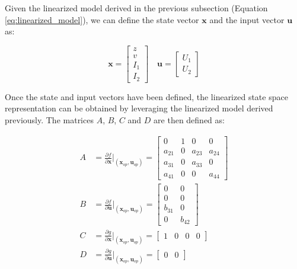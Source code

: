 Given the linearized model derived in the previous subsection (Equation \ref{eq:linearized_model}), we can define the state vector $\mathbf{x}$ and the input vector $\mathbf{u}$ as:

\begin{equation}
    \mathbf{x} = \begin{bmatrix}
        z   \\
        v   \\
        I_1 \\
        I_2
    \end{bmatrix}
    \quad
    \mathbf{u} = \begin{bmatrix}
        U_1 \\
        U_2
    \end{bmatrix}
\end{equation}

Once the state and input vectors have been defined, the linearized state space representation can be obtained by leveraging the linearized model derived previously.
The matrices $A$, $B$, $C$ and $D$ are then defined as:

\begin{equation}
    \begin{aligned}
        A & = \frac{\partial f}{\partial \mathbf{x}} \Bigg|_{(\mathbf{x}_{op}, \mathbf{u}_{op})}
        = \begin{bmatrix}
              0      & 1 & 0      & 0      \\
              a_{21} & 0 & a_{23} & a_{24} \\
              a_{31} & 0 & a_{33} & 0      \\
              a_{41} & 0 & 0      & a_{44}
          \end{bmatrix}                                                           \\
        B & = \frac{\partial f}{\partial \mathbf{u}} \Bigg|_{(\mathbf{x}_{op}, \mathbf{u}_{op})}
        = \begin{bmatrix}
              0      & 0      \\
              0      & 0      \\
              b_{31} & 0      \\
              0      & b_{42}
          \end{bmatrix}                                                                        \\
        C & = \frac{\partial g}{\partial \mathbf{x}} \Bigg|_{(\mathbf{x}_{op}, \mathbf{u}_{op})}
        = \begin{bmatrix}
              1 & 0 & 0 & 0
          \end{bmatrix}                                                                         \\
        D & = \frac{\partial g}{\partial \mathbf{u}} \Bigg|_{(\mathbf{x}_{op}, \mathbf{u}_{op})}
        = \begin{bmatrix}
              0 & 0
          \end{bmatrix}
    \end{aligned}
\end{equation}


